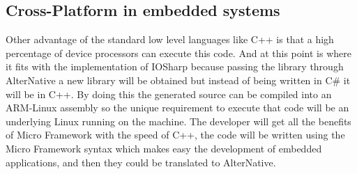 \subsection{Cross-Platform in embedded systems}\label{SS:AN-Use-Cases-NETMF}
Other advantage of the standard low level languages like C++ is that a high percentage of device processors can execute this code. And at this point is where it fits with the implementation of IOSharp because passing the library through AlterNative a new library will be obtained but instead of being written in C\# it will be in C++. By doing this the generated source can be compiled into an ARM-Linux assembly so the unique requirement to execute that code will be an underlying Linux running on the machine. The developer will get all the benefits of Micro Framework with the speed of C++, the code will be written using the Micro Framework syntax which makes easy the development of embedded applications, and then they could be translated to AlterNative.

